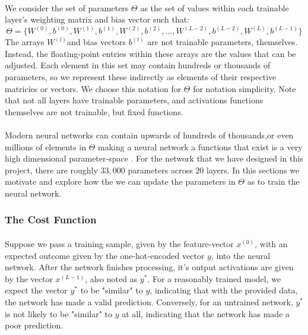 \documentclass[12pt,letterpaper]{article}
\begin{document}
\paragraph*{}We consider the set of parameters $\Theta$ as the set of values within each trainable layer's weighting matrix and bias vector such that:
\begin{equation}
\label{eqn-Theta}
\Theta = \big\{
W^{(0)}, b^{(0)}, W^{(1)}, b^{(1)}, W^{(2)}, b^{(2)}, ... ,W^{(L-2)}, b^{(L-2)}, W^{(L)}, b^{(L-1)}
\big\}
\end{equation}
The arrays $W^{(l)}$and bias vectors $b^{(l)}$ are not trainable parameters, themselves. Instead, the floating-point entries within these arrays are the values that can be adjusted. Each element in this set may contain hundreds or thousands of parameters, so we represent these indirectly as elements of their respective matricies or vectors. We choose this notation for $\Theta$ for notation simplicity. Note that not all layers have trainable parameters, and activations functions themselves are not trainable, but fixed functions.

\paragraph*{}Modern neural networks can contain upwards of hundreds of thousands,or even millions of elements in $\Theta$ making a neural network a functions that exist is a very high dimensional parameter-space \cite{Geron,Goodfellow,Levine}. For the network that we have designed in this project, there are roughly $33,000$ parameters across $20$ layers. In this sections we motivate and explore how the we can update the parameters in $\Theta$ as to train the neural network.


\subsubsection{The Cost Function}

\paragraph*{}Suppose we pass a training sample, given by the feature-vector $x^{(0)}$, with an expected outcome given by the one-hot-encoded vector $y$, into the neural network. After the network finishes processing, it's output activations are given by the vector $x^{(L-1)}$, also noted as $y^*$. For a reasonably trained model, we expect the vector $y^*$ to be "similar" to $y$, indicating that with the provided data, the network has made a valid prediction. Conversely, for an untrained network, $y^*$ is not likely to be "similar" to $y$ at all, indicating that the network has made a poor prediction. 
\end{document}

